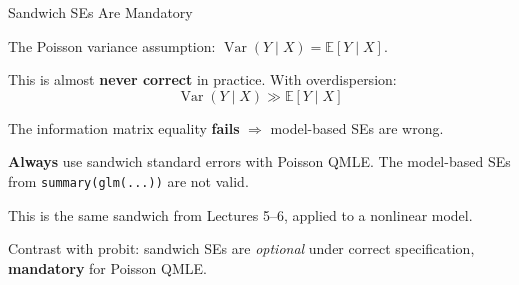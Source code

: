 \documentclass[aspectratio=169, handout, t]{beamer}
\numberwithin{equation}{section}
\begin{document}
\begin{frame}{Sandwich SEs Are Mandatory}

The Poisson variance assumption: $\operatorname{Var}(Y \mid X) = \mathbb{E}[Y \mid X]$.

\pause

\bigskip

This is almost \textbf{never correct} in practice. With overdispersion:
\[
\operatorname{Var}(Y \mid X) \gg \mathbb{E}[Y \mid X]
\]

\pause

The information matrix equality \textbf{fails} $\Rightarrow$ model-based SEs are wrong.

\pause

\bigskip

\begin{tcolorbox}[colback=blue!5, colframe=blue!50, title=Practical Rule]
\textbf{Always} use sandwich standard errors with Poisson QMLE. The model-based SEs from \texttt{summary(glm(...))} are not valid.

\medskip

This is the same sandwich from Lectures 5--6, applied to a nonlinear model.
\end{tcolorbox}

\pause

\bigskip

Contrast with probit: sandwich SEs are \emph{optional} under correct specification, \textbf{mandatory} for Poisson QMLE.

\end{frame}

\end{document}
